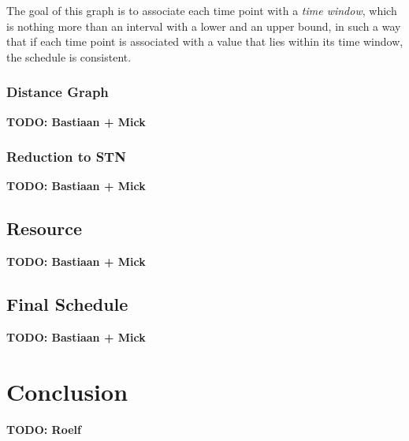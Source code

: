 \documentclass{article}
\theoremstyle{definition}
\newcommand{\TODO}[1]{{\color{red}\textbf{TODO: #1}}}
\begin{document}

The goal of this graph is to associate each time point with a \emph{time window}, which is nothing more than an interval with a lower and an upper bound, in such a way that if each time point is associated with a value that lies within its time window, the schedule is consistent.

\subsubsection{Distance Graph}


\TODO{Bastiaan + Mick}


\subsubsection{Reduction to STN}


\TODO{Bastiaan + Mick}


\subsection{Resource}

\TODO{Bastiaan + Mick}

\subsection{Final Schedule}

\TODO{Bastiaan + Mick}


\newpage


\section{Conclusion}

\TODO{Roelf}


\citet{brucker99}

\citet{herroelen05}

\citet{policella07}

\citet{lombardi10}

\citet{cesta98}

\citet{deblaere10}


\newpage


\end{document}
